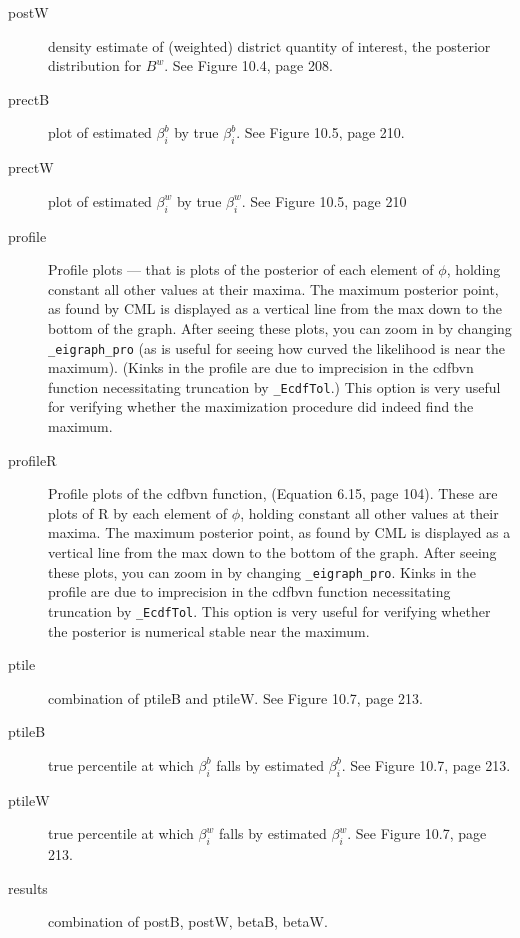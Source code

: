 \documentclass[11pt,titlepage]{article}
\begin{document}
\begin{description}
\item[postW] density estimate of (weighted) district quantity of
  interest, the posterior distribution for $B^w$.  See Figure
  10.4, page 208.

\item[prectB] plot of estimated $\beta^b_i$ by true $\beta^b_i$.  See
  Figure 10.5, page 210.

\item[prectW] plot of estimated $\beta^w_i$ by true $\beta^w_i$.  See
  Figure 10.5, page 210

\item[profile] Profile plots --- that is plots of the posterior of
  each element of $\phi$, holding constant all other values at their
  maxima.  The maximum posterior point, as found by CML is displayed
  as a vertical line from the max down to the bottom of the graph.
  After seeing these plots, you can zoom in by changing
  \texttt{\_eigraph\_pro} (as is useful for seeing how curved the
  likelihood is near the maximum).  (Kinks in the profile are due to
  imprecision in the cdfbvn function necessitating truncation by
  \texttt{\_EcdfTol}.)  This option is very useful for verifying
  whether the maximization procedure did indeed find the maximum.

\item[profileR] Profile plots of the cdfbvn function, (Equation 6.15,
  page 104).  These are plots of R by each element of $\phi$, holding
  constant all other values at their maxima.  The maximum posterior
  point, as found by CML is displayed as a vertical line from the max
  down to the bottom of the graph.  After seeing these plots, you can
  zoom in by changing \texttt{\_eigraph\_pro}.  Kinks in the profile
  are due to imprecision in the cdfbvn function necessitating
  truncation by \texttt{\_EcdfTol}.  This option is very useful for
  verifying whether the posterior is numerical stable near the
  maximum.

\item[ptile] combination of ptileB and ptileW.  See Figure
   10.7, page 213.

\item[ptileB] true percentile at which $\beta_i^b$ falls by estimated
  $\beta_i^b$.  See Figure 10.7, page 213.

\item[ptileW] true percentile at which $\beta_i^w$ falls by estimated
  $\beta_i^w$.  See Figure 10.7, page 213.

\item[results] combination of postB, postW, betaB, betaW.


\end{description}
\end{document}
